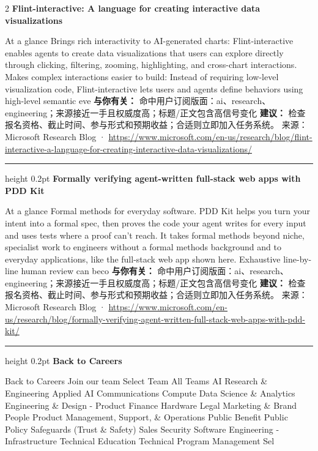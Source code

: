 \documentclass[10.5pt]{ctexart}
\begin{document}
\begin{multicols}{2}
{\large\bfseries Flint-interactive: A language for creating interactive data visualizations}\par
At a glance Brings rich interactivity to AI-generated charts: Flint-interactive enables agents to create data visualizations that users can explore directly through clicking, filtering, zooming, highlighting, and cross-chart interactions. Makes complex interactions easier to build: Instead of requiring low-level visualization code, Flint-interactive lets users and agents define behaviors using high-level semantic eve
\textbf{与你有关：} 命中用户订阅版面：ai、research、engineering；来源接近一手且权威度高；标题/正文包含高信号变化
\textbf{建议：} 检查报名资格、截止时间、参与形式和预期收益；合适则立即加入任务系统。
{\footnotesize\color{ormuted} 来源：Microsoft Research Blog · \url{https://www.microsoft.com/en-us/research/blog/flint-interactive-a-language-for-creating-interactive-data-visualizations/}}
\vspace{2mm}
\hrule height 0.2pt
\vspace{2mm}
{\large\bfseries Formally verifying agent-written full-stack web apps with PDD Kit}\par
At a glance Formal methods for everyday software. PDD Kit helps you turn your intent into a formal spec, then proves the code your agent writes for every input and uses tests where a proof can’t reach. It takes formal methods beyond niche, specialist work to engineers without a formal methods background and to everyday applications, like the full-stack web app shown here. Exhaustive line-by-line human review can beco
\textbf{与你有关：} 命中用户订阅版面：ai、research、engineering；来源接近一手且权威度高；标题/正文包含高信号变化
\textbf{建议：} 检查报名资格、截止时间、参与形式和预期收益；合适则立即加入任务系统。
{\footnotesize\color{ormuted} 来源：Microsoft Research Blog · \url{https://www.microsoft.com/en-us/research/blog/formally-verifying-agent-written-full-stack-web-apps-with-pdd-kit/}}
\vspace{2mm}
\hrule height 0.2pt
\vspace{2mm}
{\large\bfseries Back to Careers}\par
Back to Careers Join our team Select Team All Teams AI Research \& Engineering Applied AI Communications Compute Data Science \& Analytics Engineering \& Design - Product Finance Hardware Legal Marketing \& Brand People Product Management, Support, \& Operations Public Benefit Public Policy Safeguards (Trust \& Safety) Sales Security Software Engineering - Infrastructure Technical Education Technical Program Management Sel

\end{multicols}
\end{document}
